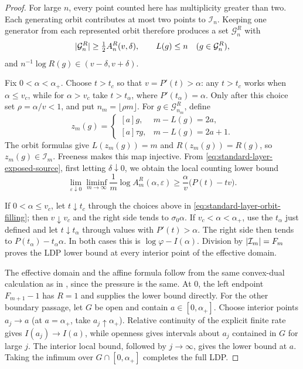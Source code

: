 \begin{proof}
For large \(n\), every point counted here has multiplicity greater than two.
Each generating orbit contributes at most two points to \(\mathcal I_n\).
Keeping one generator from each represented orbit therefore produces a set
\(\mathcal G_n^R\) with
\[
 \lvert \mathcal G_n^R \rvert\ge\tfrac12A_n^R(v,\delta),
 \qquad L(g)\le n\quad(g\in\mathcal G_n^R),
\]
and \(n^{-1}\log R(g)\in(v-\delta,v+\delta)\).

Fix \(0<\alpha<\alpha_+\).  Choose \(t>t_c\) so that
\(v=P'(t)>\alpha\): any \(t>t_c\) works when \(\alpha\le v_c\), while for
\(\alpha>v_c\) take \(t>t_\alpha\), where
\(P'(t_\alpha)=\alpha\).  Only after this choice set
\(\rho=\alpha/v<1\), and put
\(n_m=\lfloor\rho m\rfloor\).  For \(g\in\mathcal G_{n_m}^R\), define
\[
 z_m(g)=
 \begin{cases}
  [a]g,&m-L(g)=2a,\\
  [a]\tau g,&m-L(g)=2a+1.
 \end{cases}
\]
The orbit formulas give \(L(z_m(g))=m\) and
\(R(z_m(g))=R(g)\), so \(z_m(g)\in\mathcal I_m\).  Freeness makes this map
injective.  From \eqref{eq:standard-layer-exposed-source}, first letting
\(\delta\downarrow0\), we obtain the local counting lower bound
\begin{equation}
 \lim_{\varepsilon\downarrow0}\liminf_{m\to\infty}\frac1m
 \log A_m^R(\alpha,\varepsilon)
 \ge\frac{\alpha}{v}\bigl(P(t)-tv\bigr).
 \label{eq:standard-layer-orbit-filling}
\end{equation}

If \(0<\alpha\le v_c\), let \(t\downarrow t_c\) through the choices above in
\eqref{eq:standard-layer-orbit-filling}; then \(v\downarrow v_c\) and the
right side tends to \(\sigma_0\alpha\).  If
\(v_c<\alpha<\alpha_+\), use the \(t_\alpha\) just defined and let
\(t\downarrow t_\alpha\) through values with
\(P'(t)>\alpha\).  The right side then tends to
\(P(t_\alpha)-t_\alpha\alpha\).  In both cases this is
\(\log\varphi-I(\alpha)\).  Division by
\(\lvert \mathcal I_m \rvert=F_m\) proves the LDP lower bound at every interior
point of the effective domain.

The effective domain and the affine formula follow from the same convex-dual
calculation as in , since the pressure is the same.
At \(0\), the left endpoint \(F_{m+1}-1\) has \(R=1\) and supplies the lower
bound directly.  For the other boundary passage, let \(G\) be open and contain
\(a\in[0,\alpha_+]\).  Choose interior points \(a_j\to a\) (at
\(a=\alpha_+\), take \(a_j\uparrow\alpha_+\)).  Relative continuity of the
explicit finite rate gives \(I(a_j)\to I(a)\), while openness gives intervals
about \(a_j\) contained in \(G\) for large \(j\).  The interior local bound,
followed by \(j\to\infty\), gives the lower bound at \(a\).  Taking the
infimum over \(G\cap[0,\alpha_+]\) completes the full LDP.
\end{proof}

